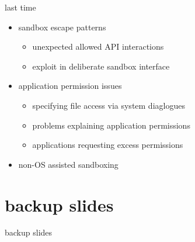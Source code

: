 \date{}
\title{}
\date{}
\usepackage[outputdir=latex.out]{minted}

\begin{frame}
    \titlepage
\end{frame}




\begin{frame}{last time}
    \begin{itemize}
    \item sandbox escape patterns
        \begin{itemize}
        \item unexpected allowed API interactions
        \item exploit in deliberate sandbox interface
        \end{itemize}
    \item application permission issues
        \begin{itemize}
        \item specifying file access via system diaglogues
        \item problems explaining application permissions
        \item applications requesting excess permissions
        \end{itemize}
    \item non-OS assisted sandboxing
    \end{itemize}
\end{frame}








\section{backup slides}
\begin{frame}{backup slides}
\end{frame}



